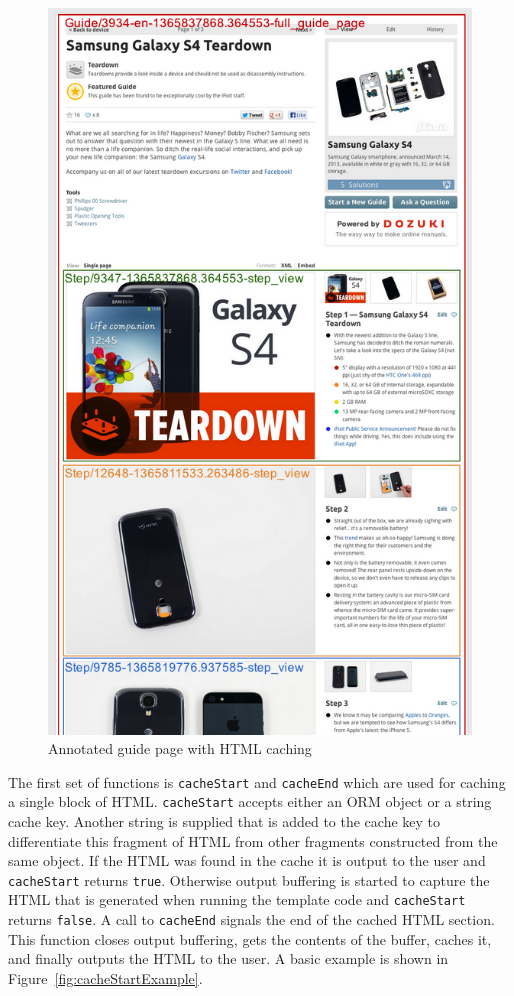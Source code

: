 \documentclass[12pt]{ucthesis}
\begin{document}
\begin{figure}[hbtp]
\centering
\includegraphics[width=\textwidth,height=0.95\textheight]{assets/annotatedCachedGuidePage.png}
\caption{Annotated guide page with HTML caching}
\label{fig:annotatedCachedGuidePage}
\end{figure}

The first set of functions is {\tt cacheStart} and {\tt cacheEnd} which are used for caching a single block of HTML\@.
{\tt cacheStart} accepts either an ORM object or a string cache key.
Another string is supplied that is added to the cache key to differentiate this fragment of HTML from other fragments constructed from the same object.
If the HTML was found in the cache it is output to the user and {\tt cacheStart} returns {\tt true}.
Otherwise output buffering is started to capture the HTML that is generated when running the template code and {\tt cacheStart} returns {\tt false}.
A call to {\tt cacheEnd} signals the end of the cached HTML section.
This function closes output buffering, gets the contents of the buffer, caches it, and finally outputs the HTML to the user.
A basic example is shown in Figure~\ref{fig:cacheStartExample}.
\end{document}
